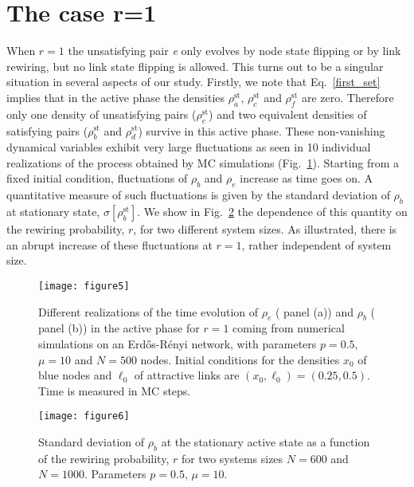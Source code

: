 \documentclass[aps,pre,notitlepage]{revtex4-1}
\begin{document}
\section*{The case r=1}
When $r=1$ the unsatisfying pair \textit{e} only evolves by node state flipping or by link rewiring, but no link state flipping
is allowed. This turns out to be a singular situation in several aspects of our study. Firstly, we note that Eq.~\eqref{first_set}
implies that in the active phase the densities $\rho_a^\text{st}$, $\rho_c^\text{st}$ and $\rho_f^\text{st}$ are zero.
Therefore only one density of unsatisfying pairs ($\rho_e^\text{st}$) and two equivalent densities of satisfying pairs
($\rho_b^\text{st}$ and $\rho_d^\text{st}$) survive in this active phase. These non-vanishing dynamical variables exhibit very
large fluctuations as seen in 10 individual realizations of the process obtained by MC simulations
(Fig.~\ref{single_realization}). Starting from a fixed initial condition, fluctuations of $\rho_{b}$ and $\rho_{e}$
increase as time goes on. A quantitative measure of such fluctuations is given by the standard deviation of
$\rho_{b}$ at stationary state, $\sigma[\rho_{b}^\text{st}]$. We show in Fig.~\ref{sigma_b} the dependence of this quantity
on the rewiring probability, $r$, for two different system sizes. As illustrated, there is an abrupt increase of these fluctuations
at $r=1$, rather independent of system size.
\begin{figure}[]
\centering
\texttt{[image: figure5]}
\caption{Different realizations of the time evolution of $\rho_{e}$ ( panel (a)) and $\rho_{b}$ ( panel (b)) in the active phase for $r=1$ coming from numerical simulations on an Erd\H{o}s-R\'enyi network, with parameters $p=0.5$, $\mu=10$ and $N=500$ nodes. Initial conditions for the densities $x_0$ of blue nodes and $\ell_0$ of attractive links are $(x_0,\ell_0)=(0.25,0.5)$. Time is measured in MC steps.
}
\label{single_realization}
\end{figure}
\begin{figure}[]
 \centering
 \texttt{[image: figure6]}
\caption{Standard deviation of $\rho_{b}$ at the stationary active state as a function of the rewiring probability, $r$ for two systems sizes $N=600$ and $N=1000$. Parameters $p=0.5$, $\mu=10$.}
\label{sigma_b}
\end{figure}
\end{document}
